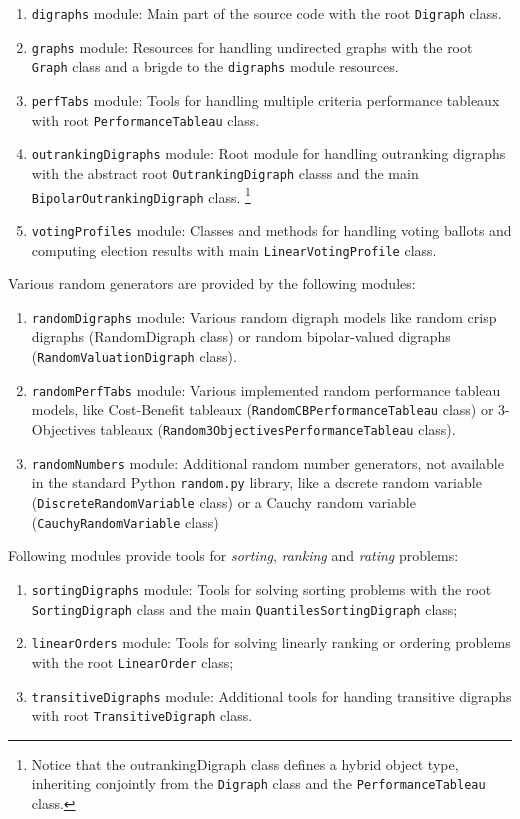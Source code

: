 \begin{enumerate}[leftmargin=1cm]
\item \texttt{digraphs} module: Main part of the \Digraph source code with the root \texttt{Digraph} class.
\item \texttt{graphs} module: Resources for handling undirected graphs with the root \texttt{Graph} class and a brigde to the \texttt{digraphs} module resources.
\item \texttt{perfTabs} module: Tools for handling multiple criteria performance tableaux with root \texttt{PerformanceTableau} class.
\item \texttt{outrankingDigraphs} module: Root module for handling outranking digraphs with the abstract root \texttt{OutrankingDigraph} classs and the main \texttt{BipolarOutrankingDigraph} class. \footnote{Notice that the outrankingDigraph class defines a hybrid object type, inheriting conjointly from the \texttt{Digraph} class and the \texttt{PerformanceTableau} class.}
\item \texttt{votingProfiles} module: Classes and methods for handling voting ballots and computing election results with main \texttt{LinearVotingProfile} class.
\end{enumerate}

\noindent Various random generators are provided by the following modules:

\begin{enumerate}[leftmargin=1cm]
\item \texttt{randomDigraphs} module: Various random digraph models like random crisp digraphs (RandomDigraph class) or random bipolar-valued digraphs (\texttt{RandomValuationDigraph} class).
\item \texttt{randomPerfTabs} module: Various implemented random performance tableau models, like Cost-Benefit tableaux (\texttt{RandomCBPerformance\-Tableau} class) or 3-Objectives tableaux (\texttt{Random3ObjectivesPer\-formance\-Tableau} class).
\item \texttt{randomNumbers} module: Additional random number generators, not available in the standard Python \texttt{random.py} library, like a dscrete random variable (\texttt{DiscreteRandomVariable} class) or a Cauchy random variable (\texttt{CauchyRandomVariable} class)
\end{enumerate}

\noindent Following modules provide tools for \emph{sorting}, \emph{ranking} and \emph{rating} problems:

\begin{enumerate}[leftmargin=1cm]
\item \texttt{sortingDigraphs} module: Tools for solving sorting problems with the root \texttt{SortingDigraph} class and the main \texttt{QuantilesSortingDi\-graph} class;
\item \texttt{linearOrders} module: Tools for solving linearly ranking or ordering problems with the root \texttt{LinearOrder} class;
\item \texttt{transitiveDigraphs} module: Additional tools for handing transitive digraphs with root \texttt{TransitiveDigraph} class.
\end{enumerate}

